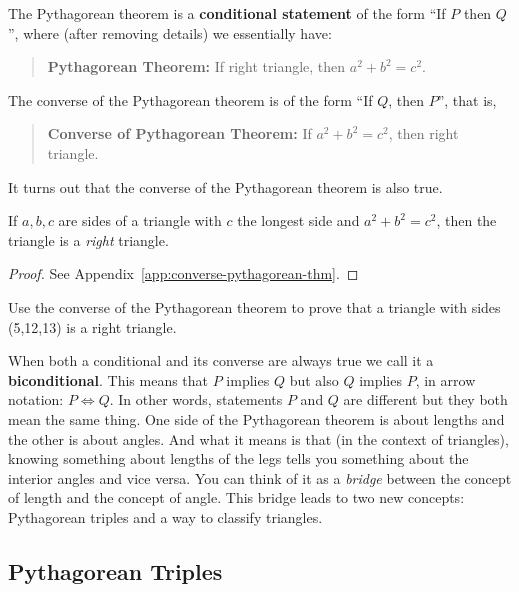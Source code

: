 The Pythagorean theorem is a \textbf{conditional statement} of the
form ``If \(P\) then \(Q\)'', where (after removing details) we
essentially have:
\begin{quotation}
  \textbf{Pythagorean Theorem:} If right triangle, then
  \(a^{2}+b^{2} = c^{2}\).
\end{quotation}
The converse of the Pythagorean theorem is of the form ``If \(Q\),
then \(P\)'', that is,
\begin{quotation}
  \textbf{Converse of Pythagorean Theorem:} If \(a^{2}+b^{2} = c^{2}\),
  then right triangle.
\end{quotation}
It turns out that the converse of the Pythagorean theorem is also
true.

\begin{theorem}
  If \(a,b,c\) are sides of a triangle with \(c\) the longest side and
  \(a^{2} + b^{2} = c^{2}\), then the triangle is a \emph{right}
  triangle.
\end{theorem}
\begin{proof}
See Appendix~\ref{app:converse-pythagorean-thm}.
\end{proof}

\begin{exercise}
  Use the converse of the Pythagorean theorem to prove that a
  triangle with sides (5,12,13) is a right triangle.

\end{exercise}

When both a conditional and its converse are always true we call it a
\textbf{biconditional}. This means that \(P\) implies \(Q\) but also
\(Q\) implies \(P\), in arrow notation: \(P \Leftrightarrow Q\). In
other words, statements \(P\) and \(Q\) are different but they both
mean the same thing. One side of the Pythagorean theorem is about
lengths and the other is about angles. And what it means is that (in
the context of triangles), knowing something about lengths of the legs
tells you something about the interior angles and vice versa. You can
think of it as a \emph{bridge} between the concept of length and the
concept of angle. This bridge leads to two new concepts: Pythagorean
triples and a way to classify triangles.

\newpage

\subsection{Pythagorean Triples}%
\label{sub:pythagorean-triples}

